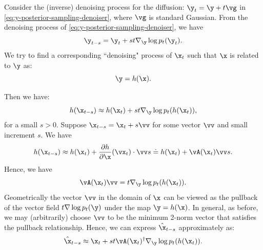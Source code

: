 \documentclass[../../book-main.tex]{subfiles}
\begin{document}
Consider the (inverse) denoising process for the diffusion: $\y_t =
\y + t\vg $ in \eqref{eq:y-posterior-sampling-denoiser}, where $\vg$
is standard Gaussian. From the denoising process of
\eqref{eq:y-posterior-sampling-denoiser}, we have
\begin{equation}
    \y_{t-s} =  \y_t + st \nabla_{\y} \log p_t(\y_t).
\end{equation}
We try to find a corresponding ``denoising" process of $\x_t$ such
that $\x$ is related to $\y$ as:
\begin{equation}
    \y =  h(\x).
\end{equation}

Then we have:
\begin{equation}
    h(\x_{t-s}) \approx h(\x_t) + st \nabla_{\y} \log p_t(h(\x_t)),
\end{equation}
for a small $s >0$.
Suppose $\x_{t-s} = \x_t + s \vv$ for some vector $\vv$ and small
increment $s$. We have
\begin{equation}
    h(\x_{t-s}) \approx h(\x_t) + \frac{\partial h}{\partial
    \x}(\vx_{t}) \cdot \vv s \doteq h(\x_t) + \vA(\x_t) \vv s.
\end{equation}
Hence, we have
\begin{equation}
    \vA(\x_t) \vv = t \nabla_{\y} \log p_t(h(\x_t)).
    \label{eqn:pushforward}
\end{equation}
Geometrically the vector $\vv$ in the domain of $\x$ can be viewed as
the pullback of the vector field $t \nabla \log p_t(\y)$ under the
map $\y = h(\x)$. In general, as before, we may (arbitrarily) choose
$\vv$ to be the minimum 2-norm vector that satisfies the pullback
relationship. Hence, we can express  $\hat{\x}_{t-s}$ approximately as:
\begin{equation}
    \hat{\x}_{t-s} \approx \x_t + st\vA(\x_t)^\dagger \nabla_{\y}
    \log p_t(h(\x_t)).
    \label{eqn:pullback-denoise}
\end{equation}
\end{document}
